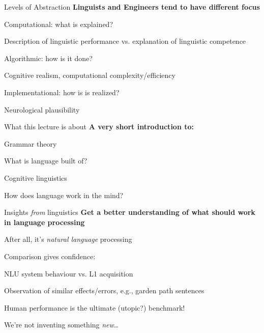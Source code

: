 \documentclass[aspectratio=169,cramped]{beamer}
\let\tempone\itemize
\let\temptwo\enditemize
\renewenvironment{itemize}{\tempone\addtolength{\itemsep}{-0\baselineskip}\addtolength{\parskip}{-0.2\baselineskip}}{\temptwo}
\newcommand{\ex}[1]{{\color{teal} #1}}
\begin{document}
\begin{frame}{Levels of Abstraction}
	\textbf{Linguists and Engineers tend to have different focus}
	\begin{itemize}
  \item Computational: what is explained?
    \begin{itemize}
    \item \ex{Description of linguistic performance vs. explanation of linguistic competence}
    \end{itemize}
  \item Algorithmic: how is it done?
    \begin{itemize}
    \item  \ex{Cognitive realism, computational complexity/efficiency}
    \end{itemize}
  \item Implementational: how is is realized?
    \begin{itemize}
    \item  \ex{Neurological plausibility}
    \end{itemize}
  \end{itemize}
\end{frame}

\begin{frame}{What this lecture is about}
	\textbf{A very short introduction to:}
	\begin{itemize}
  \item Grammar theory
    \begin{itemize}
    \item What is language built of?
    \end{itemize}
  \item Cognitive linguistics
    \begin{itemize}
    \item How does language work in the mind?
    \end{itemize}
  \end{itemize}
\end{frame}

\begin{frame}{Insights \textit{from} linguistics}
	\textbf{Get a better understanding of what should work in language processing}
	\begin{itemize}
  \item After all, it's \emph{natural language} processing
  \item Comparison gives confidence:
    \begin{itemize}
    \item NLU system behaviour vs. L1 acquisition
    \item Observation of similar effects/errors, e.g., garden path sentences
    \item Human performance is the ultimate (utopic?) benchmark!
    \item We're not inventing something \emph{new}\ldots
    \end{itemize}
  \end{itemize}
\end{frame}
\end{document}
